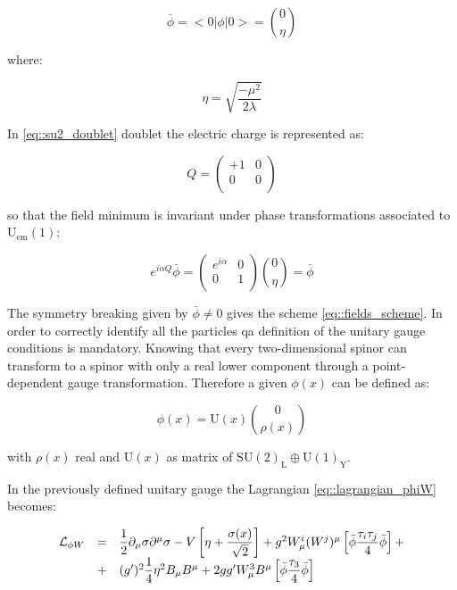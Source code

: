 \begin{equation}
 \bar{\phi}= < 0|\phi|0 > = \binom{0}{\eta}
 \label{eq::vacuum_expectation}
\end{equation}

where:

\begin{equation}
\eta = \sqrt{\dfrac{-\mu^{2}}{2\lambda}}
\label{eq::eta_value}
\end{equation}

In \autoref{eq::su2_doublet} doublet the electric charge is represented as:

\begin{equation}
Q = 
\begin{pmatrix}
+1 & 0 \\
0 & 0 \\
\end{pmatrix}
\end{equation}

so that the field minimum is invariant under phase transformations associated to $\text{U}_{\text{em}}(1)$:

\begin{equation}
e^{i\alpha Q} \bar{\phi} = 
\begin{pmatrix}
e^{i\alpha} & 0 \\
0 & 1 \\ 
\end{pmatrix}
\binom{0}{\eta}
= \bar{\phi}
\end{equation}

The symmetry breaking given by $\bar{\phi} \neq 0$ gives the scheme \ref{eq::fields_scheme}.
In order to correctly identify all the particles qa definition of the unitary gauge conditions is mandatory. Knowing that every two-dimensional spinor can transform to a spinor with only a real lower component through a point-dependent gauge transformation. Therefore a given $\phi(x)$
can be defined as:

\begin{equation}
\phi(x) = \text{U}(x) \binom{0}{\rho(x)}
\end{equation}

with $\rho(x)$ real and $\text{U}(x)$ as matrix of $ \text{SU}(2)_{\text{L}} \oplus \text{U}(1)_{\text{Y}}$. 

In the previously defined unitary gauge the Lagrangian \ref{eq::lagrangian_phiW} becomes:

\begin{equation}
\begin{array}{l c l}
\mathcal{L}_{\phi W}&=&\dfrac{1}{2} \partial_{\mu} \sigma \partial^{\mu} \sigma - V \left[ \eta + \dfrac{\sigma(x)}{\sqrt{2}}\right] + g^{2} W_{\mu}^{i}(W^{j})^{\mu} \left[ \bar{\phi} \dfrac{\tau_{i}\tau_{j}}{4}\bar{\phi}\right] +\\
&+&(g^{\prime})^{2} \dfrac{1}{4}\eta^{2} B_{\mu} B^{\mu} + 2 gg^{\prime} W^{3}_{\mu} B^{\mu} \left[ \bar{\phi} \dfrac{\tau_{3}}{4} \bar{\phi} \right]
\end{array}
\end{equation}

